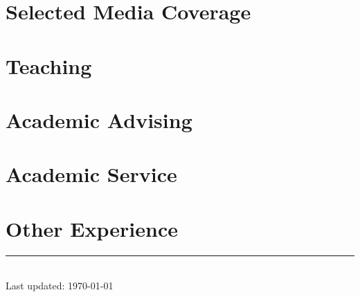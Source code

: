 \documentclass[11pt]{article} %
\newcommand{\myinput}[1]{
  
}
\begin{document}
\section*{Selected Media Coverage}
\label{media}
\myinput{media.tex} %


\section*{Teaching}
\label{teaching}
\myinput{teaching.tex}


\section*{Academic Advising}
\label{advising}
\myinput{advising.tex}


\section*{Academic Service}
\label{service}
\myinput{service.tex}


\section*{Other Experience}
\label{exp_other}
\myinput{exp_other.tex}


\centering
\rule{0.25\linewidth}{0.4pt}\\
\medskip
Last updated: \today
\end{document}

